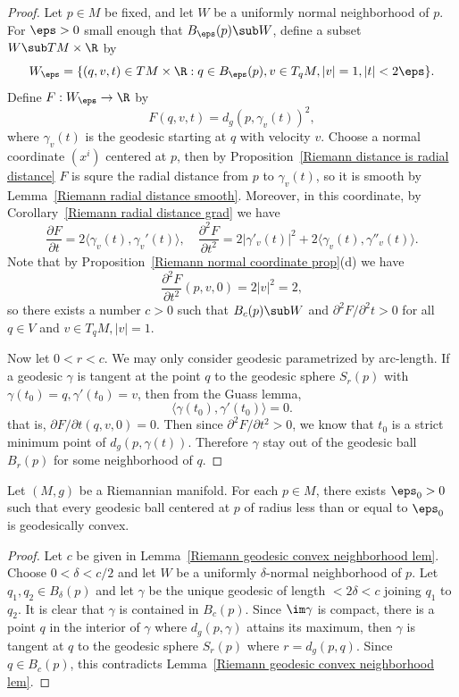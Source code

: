 \begin{proof}
Let $p\in M$ be fixed, and let $W$ be a uniformly normal neighborhood of $p$. For $\eps>0$ small enough that $B_\eps(p)\sub W$, define a subset $W\sub TM\times\R$ by
\[W_{\eps}=\{(q,v,t)\in TM\times\R:q\in B_{\eps}(p),v\in T_qM,|v|=1,|t|<2\eps\}.\]
Define $F:W_{\eps}\to\R$ by
\[F(q,v,t)=d_g(p,\gamma_v(t))^2,\]
where $\gamma_v(t)$ is the geodesic starting at $q$ with velocity $v$. Choose a normal coordinate $(x^i)$ centered at $p$, then by 
Proposition~\ref{Riemann distance is radial distance} $F$ is squre the radial distance from $p$ to $\gamma_v(t)$, so it is smooth by 
Lemma~\ref{Riemann radial distance smooth}. Moreover, in this coordinate, by Corollary~\ref{Riemann radial distance grad} we have
\[\frac{\partial F}{\partial t}=2\langle\gamma_v(t),\gamma_v'(t)\rangle,\quad\frac{\partial^2F}{\partial t^2}=2|\gamma'_v(t)|^2+2\langle\gamma_v(t),\gamma''_v(t)\rangle.\]
Note that by Proposition~\ref{Riemann normal coordinate prop}(d) we have
\[\frac{\partial^2F}{\partial t^2}(p,v,0)=2|v|^2=2,\]
so there exists a number $c>0$ such that $B_c(p)\sub W$ and $\partial^2F/\partial^2t>0$ for all $q\in V$ and $v\in T_qM,|v|=1$.\par
Now let $0<r<c$. We may only consider geodesic parametrized by arc-length. If a geodesic $\gamma$ is tangent at the point $q$ to the geodesic sphere $S_r(p)$ with $\gamma(t_0)=q,\gamma'(t_0)=v$, 
then from the Guass lemma,
\[\langle\gamma(t_0),\gamma'(t_0)\rangle=0.\]
that is, $\partial F/\partial t(q,v,0)=0$. Then since $\partial^2F/\partial t^2>0$, we know that $t_0$ is a strict minimum point of $d_g(p,\gamma(t))$. Therefore $\gamma$ stay out of the geodesic 
ball $B_r(p)$ for some neighborhood of $q$.
\end{proof}
\begin{theorem}\label{Riemann geodesic convex neighborhood}
Let $(M,g)$ be a Riemannian manifold. For each $p\in M$, there exists $\eps_0>0$ such that every geodesic ball centered at $p$ of radius less than or equal to $\eps_0$ 
is geodesically convex.
\end{theorem}
\begin{proof}
Let $c$ be given in Lemma~\ref{Riemann geodesic convex neighborhood lem}. Choose $0<\delta<c/2$ and let $W$ be a uniformly $\delta$-normal neighborhood of $p$. Let $q_1,q_2\in B_{\delta}(p)$ and let $\gamma$ be the unique geodesic of length $<2\delta<c$ joining $q_1$ to $q_2$. It is clear that $\gamma$ is contained in $B_c(p)$. Since $\im\gamma$ is compact, there is a point $q$ in the interior of $\gamma$ where $d_g(p,\gamma)$ attains its maximum, then $\gamma$ is tangent at $q$ to the geodesic sphere $S_r(p)$ where $r=d_g(p,q)$. Since $q\in B_c(p)$, this contradicts Lemma~\ref{Riemann geodesic convex neighborhood lem}.
\end{proof}

